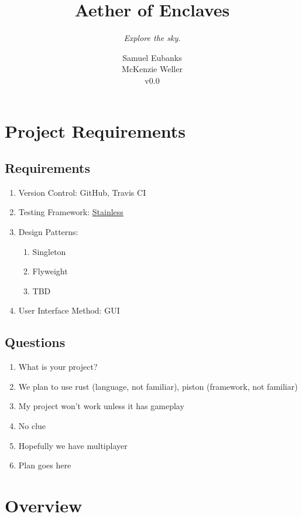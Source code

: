 \documentclass[a4paper]{scrreprt}
\title{Aether of Enclaves}
\subtitle{\textit{Explore the sky.}}
\author{
Samuel Eubanks\\
McKenzie Weller\\
v0.0
}
\begin{document}
\maketitle

\tableofcontents


\chapter{Project Requirements}

\section{Requirements}
\begin{enumerate}
   \item Version Control: GitHub, Travis CI
   \item Testing Framework: \href{https://github.com/reem/stainless}{Stainless}
   \item Design Patterns:
   \begin{enumerate}
     \item Singleton
     \item Flyweight
     \item TBD
   \end{enumerate}
   \item User Interface Method: GUI
\end{enumerate}

 \section{Questions}
 \begin{enumerate}
   \item What is your project? 
   \item We plan to use rust (language, not familiar), piston (framework, not familiar)
   \item My project won't work unless it has gameplay
   \item No clue
   \item Hopefully we have multiplayer
   \item Plan goes here
 \end{enumerate}





\chapter{Overview}
\end{document}
